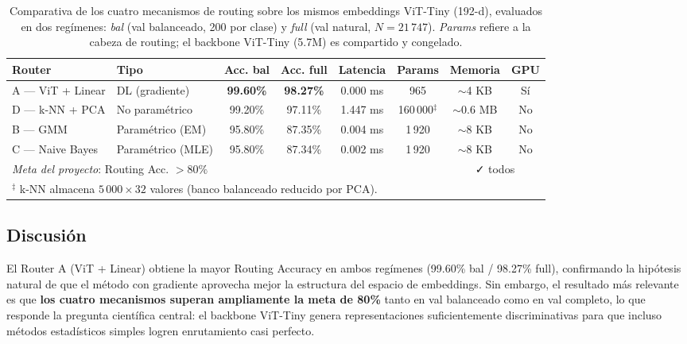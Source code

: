 \documentclass[11pt, a4paper]{article}
\begin{document}
\begin{table}[H]
\centering
\caption{Comparativa de los cuatro mecanismos de routing sobre los mismos embeddings ViT-Tiny (192-d), evaluados en dos regímenes: \textit{bal} (val balanceado, 200 por clase) y \textit{full} (val natural, $N=21\,747$). \textit{Params} refiere a la cabeza de routing; el backbone ViT-Tiny (5.7M) es compartido y congelado.}
\label{tab:ablation}
\footnotesize
\setlength{\tabcolsep}{4pt}
\begin{tabular}{llcccccc}
\toprule
\textbf{Router} & \textbf{Tipo} & \textbf{Acc. bal} & \textbf{Acc. full} & \textbf{Latencia} & \textbf{Params} & \textbf{Memoria} & \textbf{GPU} \\
\midrule
A — ViT + Linear  & DL (gradiente)     & \textbf{99.60\%} & \textbf{98.27\%} & 0.000 ms & 965       & $\sim$4 KB  & Sí \\
D — k-NN + PCA    & No paramétrico     & 99.20\%          & 97.11\%          & 1.447 ms & 160\,000$^\ddagger$ & $\sim$0.6 MB & No \\
B — GMM           & Paramétrico (EM)   & 95.80\%          & 87.35\%          & 0.004 ms & 1\,920    & $\sim$8 KB  & No \\
C — Naive Bayes   & Paramétrico (MLE)  & 95.80\%          & 87.34\%          & 0.002 ms & 1\,920    & $\sim$8 KB  & No \\
\midrule
\multicolumn{6}{l}{\textit{Meta del proyecto}: Routing Acc. $> 80\%$} & \multicolumn{2}{c}{✓ todos} \\
\bottomrule
\multicolumn{8}{l}{\footnotesize $^\ddagger$ k-NN almacena $5\,000\!\times\!32$ valores (banco balanceado reducido por PCA).} \\
\end{tabular}
\end{table}

\subsection{Discusión}

El Router A (ViT + Linear) obtiene la mayor Routing Accuracy en ambos
regímenes (99.60\% bal / 98.27\% full), confirmando la hipótesis natural
de que el método con gradiente aprovecha mejor la estructura del espacio
de embeddings. Sin embargo, el resultado más relevante es que
\textbf{los cuatro mecanismos superan ampliamente la meta de 80\%} tanto
en val balanceado como en val completo, lo que responde la pregunta
científica central: el backbone ViT-Tiny genera representaciones
suficientemente discriminativas para que incluso métodos estadísticos
simples logren enrutamiento casi perfecto.
\end{document}
